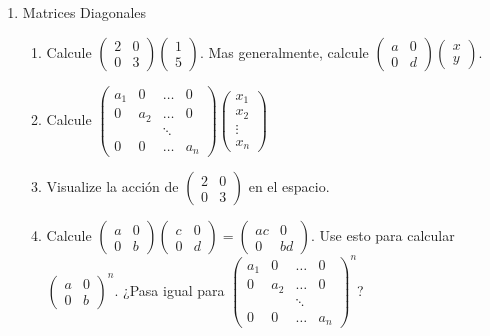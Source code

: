 \documentclass[12pt]{article}
\theoremstyle{exampstyle}
\theoremstyle{definition}
\theoremstyle{break}
\numberwithin{equation}{section}
\begin{document}
\begin{enumerate}
    \item Matrices Diagonales
    \begin{enumerate}
        \item Calcule $\begin{pmatrix} 2 & 0 \\ 0 & 3 \end{pmatrix} \begin{pmatrix} 1 \\ 5 \end{pmatrix}$. Mas generalmente, calcule $\begin{pmatrix} a & 0 \\ 0 & d \end{pmatrix} \begin{pmatrix} x \\ y \end{pmatrix}$.
        \item Calcule $\begin{pmatrix} a_1 & 0 & \dots & 0 \\ 0 & a_2 & \dots & 0 \\ & & \ddots & \\ 0 & 0 & \dots & a_n \end{pmatrix} \begin{pmatrix} x_1 \\  x_2  \\  \vdots \\ x_n \end{pmatrix}$
        \item Visualize la acción de $\begin{pmatrix} 2 & 0 \\ 0 & 3 \end{pmatrix}$ en el espacio. 
        \item Calcule $\begin{pmatrix} a & 0 \\ 0 & b \end{pmatrix}\begin{pmatrix} c & 0 \\ 0 & d \end{pmatrix}= \begin{pmatrix} ac & 0 \\ 0 & bd \end{pmatrix}$. Use esto para calcular $\begin{pmatrix} a & 0 \\ 0 & b \end{pmatrix}^n$. ¿Pasa igual para 
        $\begin{pmatrix} a_1 & 0 & \dots & 0 \\ 0 & a_2 & \dots & 0 \\ & & \ddots & \\ 0 & 0 & \dots & a_n \end{pmatrix}^n$?

\end{enumerate}
\end{enumerate}
\end{document}

